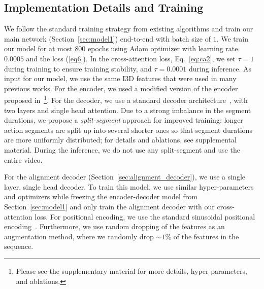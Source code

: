 \subsection{Implementation Details and Training}
We follow the standard training strategy from existing  algorithms \cite{farha2019ms,li2020ms,asrf,asformer,singhania2021coarse} and train our main network (Section~\ref{sec:model1}) end-to-end with batch size of $1$. We train our
model for at most $800$ epochs using Adam optimizer with learning rate $0.0005$ and the loss (\ref{eq6}). 
In the cross-attention loss, Eq.~\eqref{eq:ca2}, we set $\tau=1$ during training to ensure training stability, and $\tau=0.0001$ during inference.
As input for our model, we use the same I3D \cite{carreira2017quo} features that
were used in many previous works.
For the encoder, we used a modified version of the encoder proposed in~\cite{asformer}\footnote{Please see the supplementary material for more details, hyper-parameters, and ablations.\label{footnote1}}.
For the decoder, we use a standard decoder architecture~\cite{Vaswani:attention:2017}, with two layers and single head attention.
Due to a strong imbalance in the segment durations, we propose a \textit{split-segment} approach for improved training: longer action segments are split up into several shorter ones so that segment durations are more uniformly distributed; for details and ablations, see supplemental material. During the inference, we do not use any split-segment and use the entire video.

For the alignment decoder (Section~\ref{sec:alignment_decoder}), we use a single layer, single head decoder. To train this model, we use similar hyper-parameters and optimizers while freezing the encoder-decoder model from Section~\ref{sec:model1} and only train the alignment decoder with our cross-attention loss. For positional encoding, we use the standard sinusoidal positional encoding~\cite{Vaswani:attention:2017}.
Furthermore, we use random dropping of the features as an augmentation method, where we randomly drop $\sim1\%$ of the features in the sequence.


